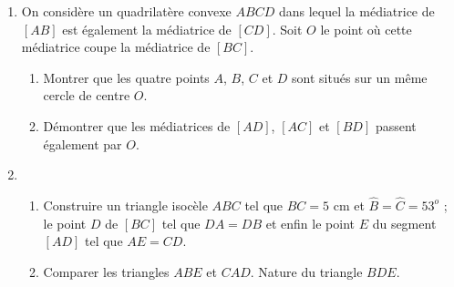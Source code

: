 \begin{enumerate}
\begin{enumerate}
\end{enumerate}
\item On considère un quadrilatère convexe $ABCD$ dans lequel la médiatrice de 
$[AB]$ est également la médiatrice de $[CD]$. Soit $O$ le point où cette médiatrice coupe la médiatrice de $[BC]$. \begin{enumerate}
\item Montrer que les quatre points $A$, $B$, $C$ et $D$ sont situés sur un même cercle de centre $O$. 
\item Démontrer que les médiatrices de $[AD]$, $[AC]$ et $[BD]$ passent également par $O$. 
\end{enumerate}
\item \begin{enumerate}
\item Construire un triangle isocèle $ABC$ tel que $BC = 5$ cm et $\widehat{B}=\widehat{C}= 53^o$ ; le point $D$ de $[BC]$ tel que $DA=DB$ et enfin le point $E$ 
du segment $[AD]$ tel que $AE=CD$.
\item Comparer les triangles $ABE$ et $CAD$. Nature du triangle $BDE$.
\end{enumerate}
\end{enumerate}